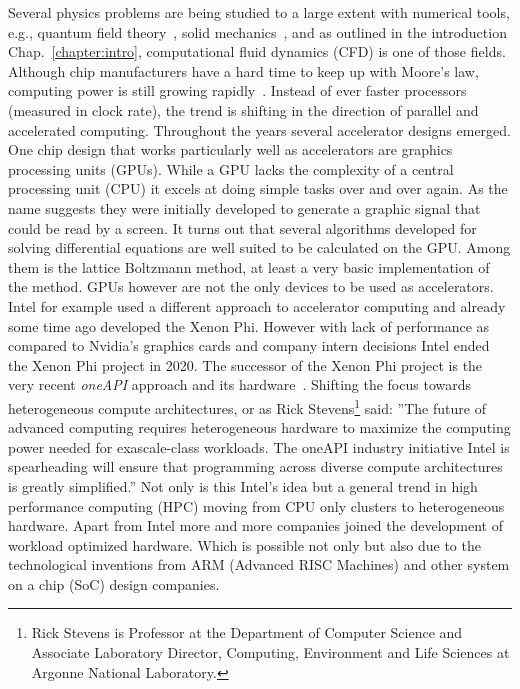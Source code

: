Several physics problems are being studied to a large extent with numerical tools, e.g., quantum field theory~\cite{montvayQuantumFieldsLattice1994}, solid mechanics~\cite{cardiffThirtyYearsFinite2021}, and as outlined in the introduction Chap.~\ref{chapter:intro}, computational fluid dynamics (CFD) is one of those fields.
Although chip manufacturers have a hard time to keep up with Moore's law, computing power is still growing rapidly~\cite{schallerMooreLawPresent1997}.
Instead of ever faster processors (measured in clock rate), the trend is shifting in the direction of parallel and accelerated computing. 
Throughout the years several accelerator designs emerged.  
One chip design that works particularly well as accelerators are graphics processing units (GPUs).
While a GPU lacks the complexity of a central processing unit (CPU) it excels at doing simple tasks over and over again.
As the name suggests they were initially developed to generate a graphic signal that could be read by a screen. 
It turns out that several algorithms developed for solving differential equations are well suited to be calculated on the GPU. 
Among them is the lattice Boltzmann method, at least a very basic implementation of the method.
GPUs however are not the only devices to be used as accelerators.
Intel for example used a different approach to accelerator computing and already some time ago developed the Xenon Phi.
However with lack of performance as compared to Nvidia's graphics cards and company intern decisions Intel ended the Xenon Phi project in 2020.
The successor of the Xenon Phi project is the very recent \textit{oneAPI} approach and its hardware~\cite{christgauPortingLegacyCUDA2020}.
Shifting the focus towards heterogeneous compute architectures, or as Rick Stevens\footnote{Rick Stevens is Professor at the Department of Computer Science and Associate Laboratory Director, Computing, Environment and Life Sciences at Argonne National Laboratory.} said: ''The future of advanced computing requires heterogeneous hardware to maximize the computing power needed for exascale-class workloads. The oneAPI industry initiative Intel is spearheading will ensure that programming across diverse compute architectures is greatly simplified.''
Not only is this Intel's idea but a general trend in high performance computing (HPC) moving from CPU only clusters to heterogeneous hardware.
Apart from Intel more and more companies joined the development of workload optimized hardware.
Which is possible not only but also due to the technological inventions from ARM (Advanced RISC Machines) and other system on a chip (SoC) design companies.

